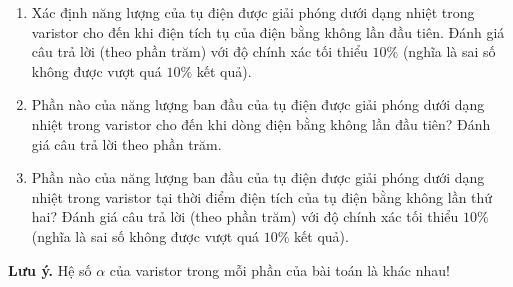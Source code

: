 \begin{vd}
\begin{enumerate}[1)]
    \item Xác định năng lượng của tụ điện được giải phóng dưới dạng nhiệt trong varistor cho đến khi điện tích tụ của điện bằng không lần đầu tiên. Đánh giá câu trả lời (theo phần trăm) với độ chính xác tối thiểu $10 \%$ (nghĩa là sai số không được vượt quá $10\%$ kết quả).
    \item Phần nào của năng lượng ban đầu của tụ điện được giải phóng dưới dạng nhiệt trong varistor cho đến khi dòng điện bằng không lần đầu tiên? Đánh giá câu trả lời theo phần trăm.
    \item Phần nào của năng lượng ban đầu của tụ điện được giải phóng dưới dạng nhiệt trong varistor tại thời điểm điện tích của tụ điện bằng không lần thứ hai? Đánh giá câu trả lời (theo phần trăm) với độ chính xác tối thiểu $10 \%$ (nghĩa là sai số không được vượt quá $10\%$ kết quả).
\end{enumerate}
\textbf{Lưu ý.} Hệ số $\alpha$ của varistor trong mỗi phần của bài toán là khác nhau!
\end{vd}
